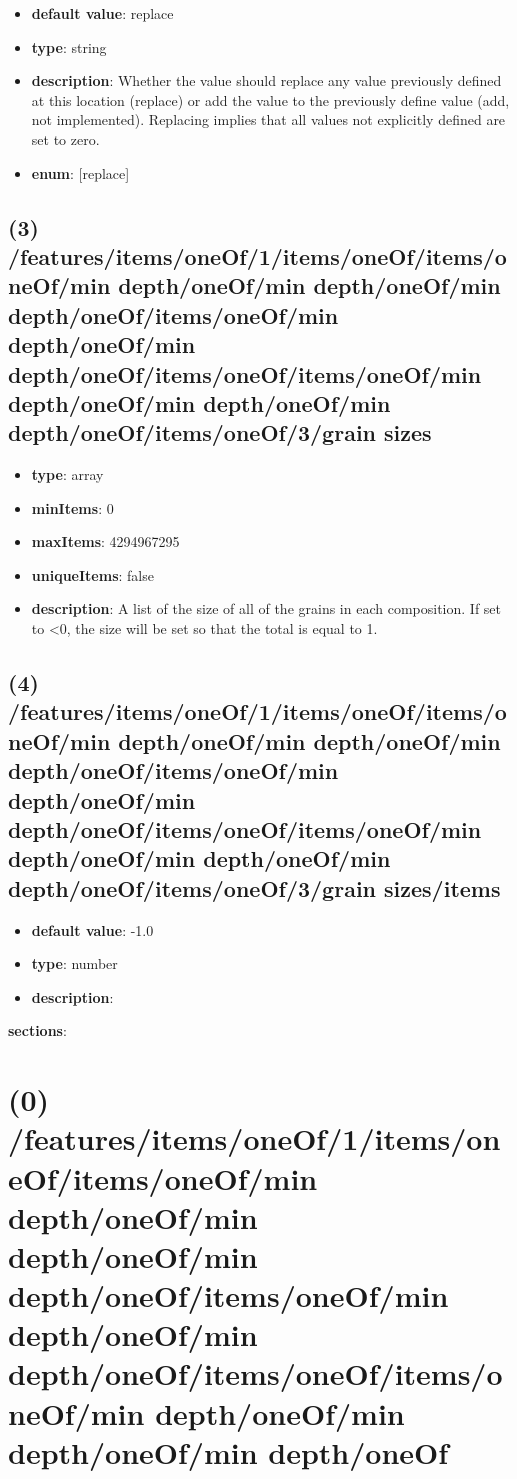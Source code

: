 \begin{itemize}[leftmargin=3em]\item {\bf default value}: replace
\item {\bf type}: string
\item {\bf description}: Whether the value should replace any value previously defined at this location (replace) or add the value to the previously define value (add, not implemented). Replacing implies that all values not explicitly defined are set to zero.
\item {\bf enum}: [replace]\end{itemize}\subsection{(3) /features/items/oneOf/1/items/oneOf/items/oneOf/min depth/oneOf/min depth/oneOf/min depth/oneOf/items/oneOf/min depth/oneOf/min depth/oneOf/items/oneOf/items/oneOf/min depth/oneOf/min depth/oneOf/min depth/oneOf/items/oneOf/3/grain sizes}
\begin{itemize}[leftmargin=3em]\item {\bf type}: array
\item {\bf minItems}: 0
\item {\bf maxItems}: 4294967295
\item {\bf uniqueItems}: false
\item {\bf description}: A list of the size of all of the grains in each composition. If set to <0, the size will be set so that the total is equal to 1.
\end{itemize}\subsection{(4) /features/items/oneOf/1/items/oneOf/items/oneOf/min depth/oneOf/min depth/oneOf/min depth/oneOf/items/oneOf/min depth/oneOf/min depth/oneOf/items/oneOf/items/oneOf/min depth/oneOf/min depth/oneOf/min depth/oneOf/items/oneOf/3/grain sizes/items}
\begin{itemize}[leftmargin=4em]\item {\bf default value}: -1.0
\item {\bf type}: number
\item {\bf description}: 
\end{itemize}\item {\bf sections}: \section{(0) /features/items/oneOf/1/items/oneOf/items/oneOf/min depth/oneOf/min depth/oneOf/min depth/oneOf/items/oneOf/min depth/oneOf/min depth/oneOf/items/oneOf/items/oneOf/min depth/oneOf/min depth/oneOf/min depth/oneOf}

